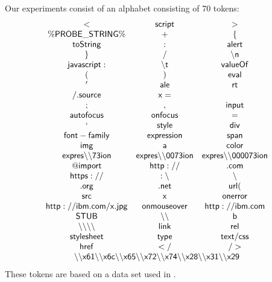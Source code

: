 Our experiments consist of an alphabet consisting of 70 tokens:
$$
\begin{array}{ccc}
\sf{<} & \sf{script} & \sf{>} \\
\sf{\%PROBE\_STRING\%}  &   \sf{+} &  \sf{\{}   \\
\sf{toString} & \sf{:} & \sf{alert} \\
\sf{\}} & \sf{/} & \sf{\backslash n} \\
\sf{javascript:} &  \sf{\backslash t} & \sf{valueOf} \\
\sf{(} & \sf{)} & \sf{eval} \\
\sf{'} & \sf{ale} & \sf{rt} \\
\sf{/.source} & \sf{x=} & \\
\sf{;} & \sf{,} & \sf{input} \\
\sf{autofocus} & \sf{onfocus} & \sf{=} \\
\sf{`} & \sf{style} & \sf{div} \\
\sf{font-family} & \sf{expression} & \sf{span} \\
\sf{img} & \sf{a} & \sf{color} \\
\multicolumn{1}{c}{\sf{expres\backslash \backslash 73ion}} &
\multicolumn{1}{c}{\sf{expres\backslash \backslash 0073ion}} &
\multicolumn{1}{c}{\sf{expres\backslash \backslash 000073ion}} \\
\sf{@import} & \sf{http://} & \sf{.com} \\
\sf{https://} & \sf{:\backslash } & \sf{\backslash } \\
\sf{.org} & \sf{.net} & \sf{url(} \\
\sf{src} & \sf{x} & \sf{onerror} \\
\sf{http://ibm.com/x.jpg} & \sf{onmouseover} & \sf{http://ibm.com} \\
\sf{STUB} & \sf{\backslash \backslash } & \sf{b} \\
\sf{\backslash \backslash \backslash \backslash } & \sf{link} &  \sf{rel} \\
\sf{stylesheet} & \sf{type} & \sf{text/css} \\
\sf{href} & \sf{</} & \sf{/>} \\
\multicolumn{3}{c}{\sf{\backslash \backslash x61\backslash \backslash x6c\backslash \backslash x65\backslash \backslash x72\backslash \backslash x74\backslash \backslash x28\backslash \backslash x31\backslash \backslash x29}}
\end{array}
$$
These tokens are based on a data set used in \cite{TrippIssta:2013}.


